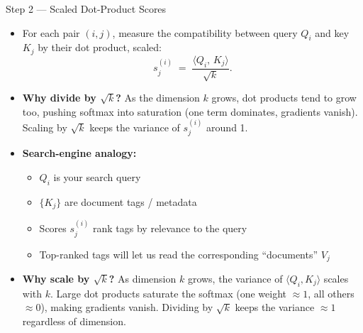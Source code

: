 \documentclass[10pt,english,aspectratio=169]{beamer}
\begin{document}
\begin{frame}{Step 2 --- Scaled Dot-Product Scores}
\begin{itemize}
\item For each pair $(i, j)$, measure the compatibility between query $Q_i$ and key $K_j$ by their dot product, scaled:
\[
   s_{j}^{(i)} \;=\; \frac{\langle Q_{i},\, K_{j} \rangle}{\sqrt{k}}.
\]

\medskip
\item \textbf{Why divide by $\sqrt{k}$?} As the dimension $k$ grows, dot products tend to grow too, pushing softmax into saturation (one term dominates, gradients vanish). Scaling by $\sqrt{k}$ keeps the variance of $s_{j}^{(i)}$ around 1.

\medskip
\item \textbf{Search-engine analogy:}
\begin{itemize}
    \item $Q_i$ is your search query
    \item $\{K_j\}$ are document tags / metadata
    \item Scores $s_j^{(i)}$ rank tags by relevance to the query
    \item Top-ranked tags will let us read the corresponding ``documents'' $V_j$
\end{itemize}

\medskip
\item \textbf{Why scale by $\sqrt{k}$?} As dimension $k$ grows, the variance of $\langle Q_i, K_j\rangle$ scales with $k$. Large dot products saturate the softmax (one weight $\approx1$, all others $\approx0$), making gradients vanish. Dividing by $\sqrt{k}$ keeps the variance $\approx1$ regardless of dimension.
\end{itemize}
\end{frame}
\end{document}
